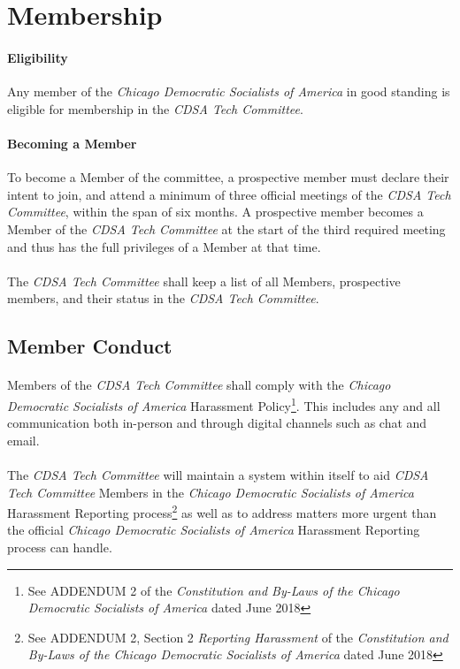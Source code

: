 \documentclass[12pt,letter,twocolumn,oneside,draft]{article}
\newcommand{\cname}{\emph{CDSA Tech Committee}}
\newcommand{\cdsa}{\emph{Chicago Democratic Socialists of America}}
\begin{document}
\section{Membership}

\paragraph{Eligibility}
Any member of the \cdsa{} in good standing is eligible for membership in the
\cname{}.

\paragraph{Becoming a Member}
To become a Member of the committee, a prospective member must declare their
intent to join, and attend a minimum of three official meetings of the
\cname{}, within the span of six months. A prospective member becomes a Member
of the \cname{} at the start of the third required meeting and thus has the
full privileges of a Member at that time.

\paragraph{}
The \cname{} shall keep a list of all Members, prospective members, and their
status in the \cname{}.

\subsection{Member Conduct}

\paragraph{}
Members of the \cname{} shall comply with the \cdsa{} Harassment
Policy\footnote{See ADDENDUM 2 of the \emph{Constitution and By-Laws of the
Chicago Democratic Socialists of America} dated June 2018}. This includes any
and all communication both in-person and through digital channels such as chat
and email.

\paragraph{}
The \cname{} will maintain a system within itself to aid \cname{} Members in
the \cdsa{} Harassment Reporting process\footnote{See ADDENDUM 2, Section 2
\emph{Reporting Harassment} of the \emph{Constitution and By-Laws of the
Chicago Democratic Socialists of America} dated June 2018} as well as to
address matters more urgent than the official \cdsa{} Harassment Reporting
process can handle.
\end{document}
